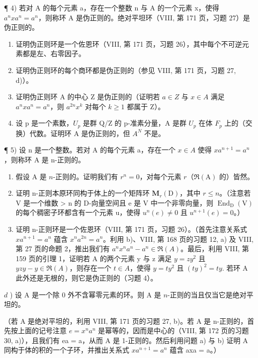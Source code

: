 ¶ 4) 若对 A 的每个元素 a，存在一个整数 n 与 A 的一个元素 x，使得 \(a^{n}xa^{n}=a^{n}\)，则称环 A 是伪正则的。绝对平坦环（VIII, 第 171 页，习题 27）是伪正则的。

\begin{enumerate}
\def\labelenumi{\alph{enumi})}
\item
  证明伪正则环是一个佐恩环（VIII, 第 171 页，习题 26），其中每个不可逆元素都是左、右零因子。
\item
  证明伪正则环的每个商环都是伪正则的（参见 VIII, 第 171 页，习题 27, d)）。
\item
  证明伪正则环 A 的中心 Z 是伪正则的（证明若 \(a \in Z\) 与 \(x \in A\) 满足 \(a^{n}xa^{n} = a^{n}\)，则 \(a^{2n}x^{k}\) 对每个 \(k \geqslant 1\) 都属于 Z）。
\item
  设 p 是一个素数，\(U_{p}\) 是群 Q/Z 的 p-准素分量，A 是群 \(U_{p}\) 在体 \(F_{p}\) 上的（交换）代数。证明环 A 是伪正则的，但 \(A^{N}\) 不是。
\end{enumerate}

¶ 5) 设 n 是一个整数。若对 A 的每个元素 a，存在一个 \(x \in A\) 使得 \(xa^{n+1} = a^n\)，则称环 A 是 n-正则的。

\begin{enumerate}
\def\labelenumi{\alph{enumi})}
\item
  假设 \(\mathrm{A}\) 是 \(n\)-正则的。证明我们有 \(r^n = 0\)，对每个元素 \(r\)（\(\Re(\mathrm{A})\) 的）皆然。
\item
  证明 n-正则本原环同构于体上的一个矩阵环 \(\mathbf{M}_{r}(\mathrm{D})\)，其中 \(r \leqslant n\)。（注意若 V 是一个维数 \textgreater{} n 的 D-向量空间且 e 是 V 中一个非零向量，则 \(\operatorname{End}_{\mathrm{D}}(\mathrm{V})\) 的每个稠密子环都含有一个元素 u，使得 \(u^{n}(e) \neq 0\) 且 \(u^{n+1}(e) = 0\)。）
\item
  证明 n-正则环是一个佐恩环（VIII, 第 171 页，习题 26）。（首先注意关系式 \(xa^{n+1}=a^{n}\) 蕴含 \(x^{n}a^{2n}=a^{n}\)。利用 b)、VIII, 第 168 页的习题 12, a) 及 VIII, 第 27 页的命题 2，推出我们有 \(a^{n}x^{n}a^{n}-a^{n}\in\Re(A)\)。最后，利用 VIII, 第 159 页的引理 1，证明若 A 的两个元素 y 与 z 满足 \(y=zy^{2}\) 且 \(yzy-y\in\Re(A)\)，则存在一个 \(t\in A\)，使得 \(y=ty^{2}\) 且 \((ty)^{2}=ty.\) 若环 A 此外还是无根的，则它是伪正则的（习题 4）。
\end{enumerate}

\(d\) ) 设 A 是一个除 0 外不含幂零元素的环。则 A 是 \(n\)-正则的当且仅当它是绝对平坦的。

（若 A 是绝对平坦的，利用 VIII, 第 171 页的习题 27, b)。若 A 是 n-正则的，首先按上面的记号注意 \(e = x^{n}a^{n}\) 是幂等的，因而是中心的（VIII, 第 172 页的习题 30, a)），且我们有 ea = a，从而 A 是 1-正则的。然后利用问题 a) 与 b) 证明 A 同构于体的积的一个子环，并推出关系式 \(xa^{n+1} = a^{n}\) 蕴含 axa = a。）

